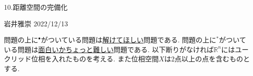 \documentclass[dvipdfmx,a4paper,11pt]{article}
\newcommand{\R}{\mathbb{R}}
\theoremstyle{definition}
\begin{document}

\begin{center}
{\Large 10.距離空間の完備化}
\end{center}

\begin{flushright}
 岩井雅崇 2022/12/13
\end{flushright}

問題の上に$^{\bullet}$がついている問題は\underline{解けてほしい}問題である. 問題の上に$^{*}$がついている問題は\underline{面白いかちょっと難しい}問題である.  以下断りがなければ$\R^{n}$にはユークリッド位相を入れたものを考える. また位相空間$X$は2点以上の点を含むものとする.
\end{document}
